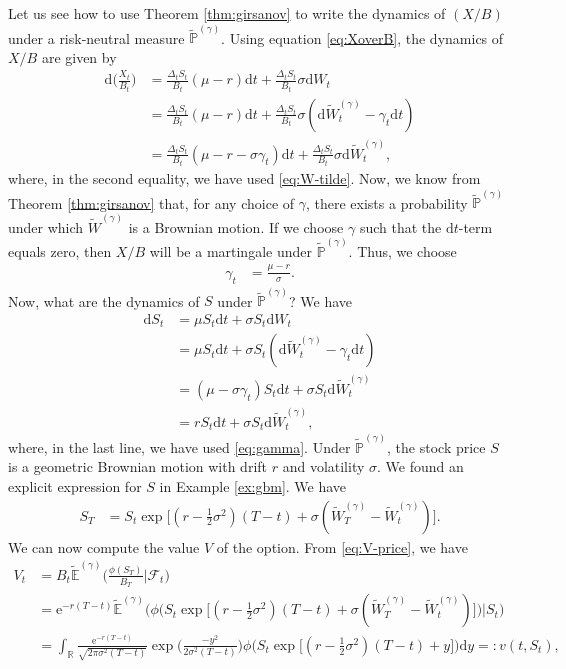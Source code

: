 \documentclass[12pt]{book}
\numberwithin{equation}{chapter}
\theoremstyle{plain}
\numberwithin{theorem}{section}
\theoremstyle{definition}
\numberwithin{exercise}{chapter}
\newcommand{\<}{\langle}
\renewcommand{\>}{\rangle}
\renewcommand{\(}{\left(}
\renewcommand{\)}{\right)}
\renewcommand{\[}{\left[}
\renewcommand{\]}{\right]}
\newcommand\Eb{\mathds{E}}
\newcommand\Pb{\mathds{P}}
\newcommand\Rb{\mathds{R}}
\newcommand\Fc{\mathscr{F}}
\newcommand\sig{\sigma}
\newcommand\gam{\gamma}
\newcommand\Del{\Delta}
\newcommand\Ebt{\widetilde{\Eb}}
\newcommand\Pbt{\widetilde{\Pb}}
\newcommand\Wt{\widetilde{W}}
\newcommand\dd{\mathrm{d}}
\newcommand\ee{\mathrm{e}}
\theoremstyle{definition}
\numberwithin{question}{section}
\begin{document}
\noindent
Let us see how to use Theorem \ref{thm:girsanov} to write the dynamics of $(X/B)$ under a risk-neutral measure $\Pbt^{(\gam)}$.  Using equation \eqref{eq:XoverB}, the dynamics of $X/B$ are given by
\begin{align}
\dd \Big( \frac{X_t}{B_t} \Big)
	&=	\frac{\Del_t S_t}{B_t} (\mu - r) \dd t +  \frac{\Del_t S_t}{B_t}  \sig \dd W_t \\
	&=	\frac{\Del_t S_t}{B_t} (\mu - r) \dd t +  \frac{\Del_t S_t}{B_t}  \sig ( \dd \Wt^{(\gam)}_t - \gam_t \dd t) \\
	&=	\frac{\Del_t S_t}{B_t} (\mu - r - \sig \gam_t) \dd t +  \frac{\Del_t S_t}{B_t}  \sig \dd \Wt^{(\gam)}_t ,
\end{align}
where, in the second equality, we have used \eqref{eq:W-tilde}.  Now, we know from Theorem \ref{thm:girsanov} that, for any choice of $\gam$, there exists a probability $\Pbt^{(\gam)}$ under which $\Wt^{(\gam)}$ is a Brownian motion.  If we choose $\gam$ such that the $\dd t$-term equals zero, then $X/B$ will be a martingale under $\Pbt^{(\gam)}$.  Thus, we choose
\begin{align}
\gam_t
	&=	\frac{\mu - r}{\sig} . \label{eq:gamma}
\end{align}
Now, what are the dynamics of $S$ under $\Pbt^{(\gam)}$?  We have
\begin{align}
\dd S_t
	&=	\mu S_t \dd t + \sig S_t \dd W_t \\
	&=	\mu S_t \dd t + \sig S_t ( \dd \Wt^{(\gam)}_t - \gam_t \dd t) \\
	&=	( \mu - \sig \gam_t ) S_t \dd t + \sig S_t \dd \Wt^{(\gam)}_t \\
	&=	r S_t \dd t + \sig S_t \dd \Wt^{(\gam)}_t ,
\end{align}
where, in the last line, we have used \eqref{eq:gamma}.  Under $\Pbt^{(\gam)}$, the stock price $S$ is a geometric Brownian motion with drift $r$ and volatility $\sig$.  We found an explicit expression for $S$ in Example \ref{ex:gbm}.  We have
\begin{align}
S_T
	&=	S_t \exp \Big[ (r - \tfrac{1}{2} \sig^2)(T - t) + \sig (\Wt^{(\gam)}_T - \Wt^{(\gam)}_t) \Big] .
\end{align}
We can now compute the value $V$ of the option.  From \eqref{eq:V-price}, we have
\begin{align}
V_t
	&=	B_t \Ebt^{(\gam)} \Big( \frac{\phi(S_T)}{B_T} \Big| \Fc_t \Big) \\
	&=	\ee^{-r(T-t)} \Ebt^{(\gam)} \Big( \phi \Big( S_t \exp \Big[ (r - \tfrac{1}{2} \sig^2)(T - t) + \sig (\Wt^{(\gam)}_T - \Wt^{(\gam)}_t) \Big] \Big) \Big| S_t \Big) \\
	&=	\int_\Rb \frac{\ee^{-r(T-t)} }{\sqrt{2 \pi \sig^2(T-t)}}  \exp \Big( \frac{- y^2}{2 \sig^2 (T-t)} \Big)
			\phi \Big( S_t \exp \Big[ (r - \tfrac{1}{2} \sig^2)(T - t) + y \Big] \Big) \dd y =: v(t,S_t) , \label{eq:BS-V}
\end{align}
\end{document}
